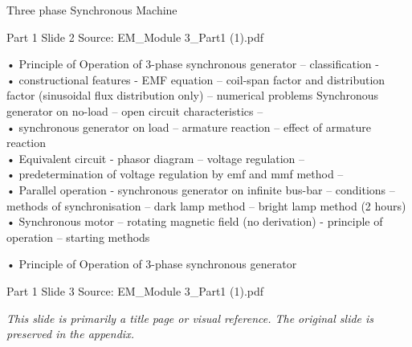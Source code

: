 \documentclass[11pt,a4paper]{article}
\begin{document}
\begin{mdframed}[roundcorner=9pt,backgroundcolor=white,linecolor=anthBlue,linewidth=1pt,innerleftmargin=12pt,innerrightmargin=12pt,innertopmargin=10pt,innerbottommargin=10pt,skipabove=8pt,skipbelow=10pt]
{\HeadingFont\fontsize{15}{18}\selectfont\color{anthDark}Three phase Synchronous Machine\par}
{\color{anthMid}\small Part 1 \textbullet{} Slide 2 \textbullet{} Source: EM\_Module 3\_Part1 (1).pdf\par}
\vspace{0.5em}
{\small
• Principle of Operation of 3-phase synchronous generator – classification -\\
• constructional features - EMF equation – coil-span factor and distribution factor (sinusoidal flux distribution only) – numerical problems Synchronous generator on no-load – open circuit characteristics –\\
• synchronous generator on load – armature reaction – effect of armature reaction\\
• Equivalent circuit - phasor diagram – voltage regulation –\\
• predetermination of voltage regulation by emf and mmf method –\\
• Parallel operation - synchronous generator on infinite bus-bar – conditions – methods of synchronisation – dark lamp method – bright lamp method (2 hours)\\
• Synchronous motor – rotating magnetic field (no derivation) - principle of operation – starting methods\\

}
\end{mdframed}

\begin{mdframed}[roundcorner=9pt,backgroundcolor=white,linecolor=anthGreen,linewidth=1pt,innerleftmargin=12pt,innerrightmargin=12pt,innertopmargin=10pt,innerbottommargin=10pt,skipabove=8pt,skipbelow=10pt]
{\HeadingFont\fontsize{15}{18}\selectfont\color{anthDark}• Principle of Operation of 3-phase synchronous generator\par}
{\color{anthMid}\small Part 1 \textbullet{} Slide 3 \textbullet{} Source: EM\_Module 3\_Part1 (1).pdf\par}
\vspace{0.5em}
{\small
\textit{This slide is primarily a title page or visual reference. The original slide is preserved in the appendix.}

}
\end{mdframed}
\end{document}
